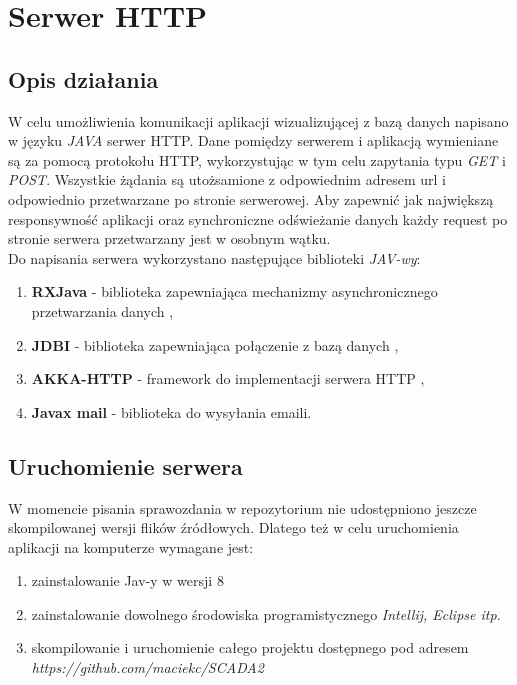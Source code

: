 \chapter{Serwer HTTP}
\section{Opis działania}
W celu umożliwienia komunikacji aplikacji wizualizującej z bazą danych napisano w języku \textit{JAVA} serwer HTTP. Dane pomiędzy serwerem i aplikacją wymieniane są za pomocą protokołu HTTP, wykorzystując w tym celu zapytania typu \textit{GET} i \textit{POST}. Wszystkie żądania są utożsamione z odpowiednim adresem url i odpowiednio przetwarzane po stronie serwerowej. Aby zapewnić jak największą responsywność aplikacji oraz synchroniczne odświeżanie danych każdy request po stronie serwera przetwarzany jest w osobnym wątku. \\
Do napisania serwera wykorzystano następujące biblioteki \textit{JAV-wy}:
\begin{enumerate}
	\item \textbf{RXJava} - biblioteka zapewniająca mechanizmy asynchronicznego przetwarzania danych \cite{rxjava},
	\item \textbf{JDBI} - biblioteka zapewniająca połączenie z bazą danych \cite{jdbi},
	\item \textbf{AKKA-HTTP} - framework do implementacji serwera HTTP \cite{akka doc},
	 \item \textbf{Javax mail} - biblioteka do wysyłania emaili.
\end{enumerate}

\section{Uruchomienie serwera}
W momencie pisania sprawozdania w repozytorium \textit{} nie udostępniono jeszcze skompilowanej wersji flików \'zródłowych. Dlatego też w celu uruchomienia aplikacji na komputerze wymagane jest: 
\begin{enumerate}
	\item zainstalowanie Jav-y w wersji 8
	\item zainstalowanie dowolnego środowiska programistycznego \textit{Intellij, Eclipse itp.}
	\item skompilowanie i uruchomienie całego projektu dostępnego pod adresem \\ \textit{https://github.com/maciekc/SCADA2}
\end{enumerate}